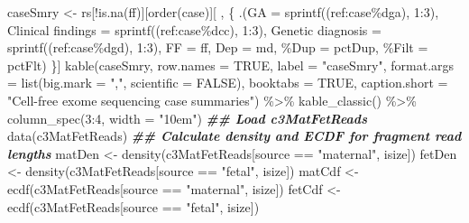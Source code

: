 \documentclass[11pt,letterpaper,oneside]{book}
\newenvironment{Shaded}{\begin{snugshade}}{\end{snugshade}}
\newcommand{\AttributeTok}[1]{\textcolor[rgb]{0.77,0.63,0.00}{#1}}
\newcommand{\ConstantTok}[1]{\textcolor[rgb]{0.00,0.00,0.00}{#1}}
\newcommand{\DecValTok}[1]{\textcolor[rgb]{0.00,0.00,0.81}{#1}}
\newcommand{\DocumentationTok}[1]{\textcolor[rgb]{0.56,0.35,0.01}{\textbf{\textit{#1}}}}
\newcommand{\FunctionTok}[1]{\textcolor[rgb]{0.00,0.00,0.00}{#1}}
\newcommand{\NormalTok}[1]{#1}
\newcommand{\OtherTok}[1]{\textcolor[rgb]{0.56,0.35,0.01}{#1}}
\newcommand{\SpecialCharTok}[1]{\textcolor[rgb]{0.00,0.00,0.00}{#1}}
\newcommand{\StringTok}[1]{\textcolor[rgb]{0.31,0.60,0.02}{#1}}
\begin{document}
\begin{Shaded}
\begin{Highlighting}[]
\NormalTok{caseSmry }\OtherTok{\textless{}{-}}\NormalTok{ rs[}\SpecialCharTok{!}\FunctionTok{is.na}\NormalTok{(ff)][}\FunctionTok{order}\NormalTok{(case)][ , \{}
\NormalTok{  .(}\AttributeTok{GA =} \FunctionTok{sprintf}\NormalTok{(}\StringTok{\textquotesingle{}(ref:case\%dga)\textquotesingle{}}\NormalTok{, }\DecValTok{1}\SpecialCharTok{:}\DecValTok{3}\NormalTok{),}
    \StringTok{\textasciigrave{}}\AttributeTok{Clinical findings}\StringTok{\textasciigrave{}} \OtherTok{=} \FunctionTok{sprintf}\NormalTok{(}\StringTok{\textquotesingle{}(ref:case\%dcc)\textquotesingle{}}\NormalTok{, }\DecValTok{1}\SpecialCharTok{:}\DecValTok{3}\NormalTok{),}
    \StringTok{\textasciigrave{}}\AttributeTok{Genetic diagnosis}\StringTok{\textasciigrave{}} \OtherTok{=} \FunctionTok{sprintf}\NormalTok{(}\StringTok{\textquotesingle{}(ref:case\%dgd)\textquotesingle{}}\NormalTok{, }\DecValTok{1}\SpecialCharTok{:}\DecValTok{3}\NormalTok{),}
    \AttributeTok{FF =}\NormalTok{ ff, }
    \AttributeTok{Dep =}\NormalTok{ md, }
    \StringTok{\textasciigrave{}}\AttributeTok{\%Dup}\StringTok{\textasciigrave{}} \OtherTok{=}\NormalTok{ pctDup, }
    \StringTok{\textasciigrave{}}\AttributeTok{\%Filt}\StringTok{\textasciigrave{}} \OtherTok{=}\NormalTok{ pctFlt)}
\NormalTok{\}]}
\FunctionTok{kable}\NormalTok{(caseSmry, }
      \AttributeTok{row.names =} \ConstantTok{TRUE}\NormalTok{,}
      \AttributeTok{label =} \StringTok{"caseSmry"}\NormalTok{,}
      \AttributeTok{format.args =} \FunctionTok{list}\NormalTok{(}\AttributeTok{big.mark =} \StringTok{","}\NormalTok{, }\AttributeTok{scientific =} \ConstantTok{FALSE}\NormalTok{),}
      \AttributeTok{booktabs =} \ConstantTok{TRUE}\NormalTok{,}
      \AttributeTok{caption.short =} \StringTok{"Cell{-}free exome sequencing case summaries"}\NormalTok{) }\SpecialCharTok{\%\textgreater{}\%}
  \FunctionTok{kable\_classic}\NormalTok{() }\SpecialCharTok{\%\textgreater{}\%}
  \FunctionTok{column\_spec}\NormalTok{(}\DecValTok{3}\SpecialCharTok{:}\DecValTok{4}\NormalTok{, }\AttributeTok{width =} \StringTok{"10em"}\NormalTok{)}
\DocumentationTok{\#\# Load c3MatFetReads}
\FunctionTok{data}\NormalTok{(c3MatFetReads)}
\DocumentationTok{\#\# Calculate density and ECDF for fragment read lengths}
\NormalTok{matDen }\OtherTok{\textless{}{-}} \FunctionTok{density}\NormalTok{(c3MatFetReads[source }\SpecialCharTok{==} \StringTok{"maternal"}\NormalTok{, isize])}
\NormalTok{fetDen }\OtherTok{\textless{}{-}} \FunctionTok{density}\NormalTok{(c3MatFetReads[source }\SpecialCharTok{==} \StringTok{"fetal"}\NormalTok{,    isize])}
\NormalTok{matCdf }\OtherTok{\textless{}{-}} \FunctionTok{ecdf}\NormalTok{(c3MatFetReads[source }\SpecialCharTok{==} \StringTok{"maternal"}\NormalTok{, isize])}
\NormalTok{fetCdf }\OtherTok{\textless{}{-}} \FunctionTok{ecdf}\NormalTok{(c3MatFetReads[source }\SpecialCharTok{==} \StringTok{"fetal"}\NormalTok{,    isize])}


\end{Highlighting}
\end{Shaded}
\end{document}
